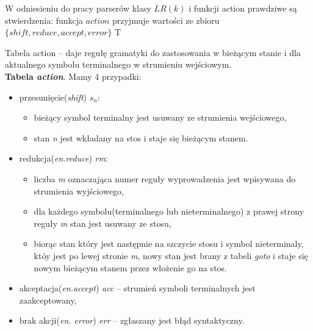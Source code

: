 \answer
{W odniesieniu do pracy parserów klasy $LR(k)$ i funkcji action prawdziwe są stwierdzenia:}
{funkcja $action$ przyjmuje wartości ze zbioru $\{shift, reduce, accept, error\}$}
{T}
{
Tabela action -- daje regułę gramatyki do zastosowania w bieżącym stanie i dla aktualnego symbolu terminalnego w strumieniu wejściowym.
\\
\textbf{Tabela \textit{action}}. Mamy 4 przypadki:
\begin{itemize}
\item{przesunięcie(\textit{shift}) $s_{n}$:}
    \begin{itemize}
    \item bieżący symbol terminalny jest usuwany ze strumienia wejściowego,
    \item stan \textit{n} jest wkładany na stos i staje się bieżącym stanem.
    \end{itemize}
\item{redukcja(\textit{en.reduce}) \textit{rm}:}
    \begin{itemize}
    \item liczba \textit{m} oznaczająca numer reguły wyprowadzenia jest wpisywana do strumienia wyjściowego,
    \item dla każdego symbolu(terminalnego lub nieterminalnego) z prawej strony reguły \textit{m} stan jest usuwany ze stosu,
    \item biorąc stan który jest następnie na szczycie stosu i symbol nieterminaly, któy jest po lewej stronie \textit{m}, nowy stan jest brany z tabeli \textit{goto} i staje się nowym bieżącym stanem przez włożenie go na stos.
    \end{itemize}
\item{akceptacja(\textit{en.accept}) \textit{acc} -- strumień symboli terminalnych jest zaakceptowany,}
\item{brak akcji(\textit{en. error}) \textit{err} -- zgłaszany jest błąd syntaktyczny.}
\end{itemize}
}
{}

